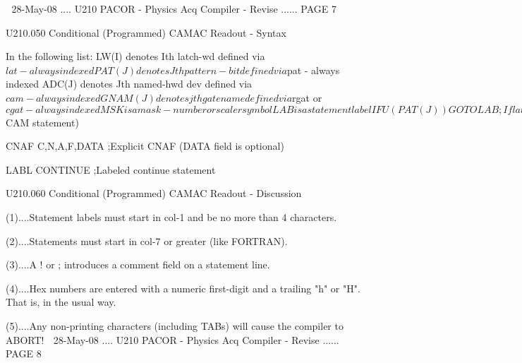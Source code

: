     
   28-May-08 .... U210  PACOR -  Physics Acq Compiler - Revise ...... PAGE   7
 
 
 
   U210.050  Conditional (Programmed) CAMAC Readout - Syntax
 
   In the following list:
   LW(I)   denotes Ith latch-wd      defined via $lat      - always indexed
   PAT(J)  denotes Jth pattern-bit   defined via $pat      - always indexed
   ADC(J)  denotes Jth named-hwd dev defined via $cam      - always indexed
   GNAM(J) denotes jth gatename defined via $rgat or $cgat - always indexed
   MSK is a mask - number or scaler symbol
   LAB is a statement label
 
   IFU(PAT(J))GOTO LAB    ;If latch-bit implied by PAT(J) not set,  GOTO LAB
   IFS(PAT(J))GOTO LAB    ;If latch-bit implied by PAT(J)  is set,  GOTO LAB
 
   IFT(GNAM(J))GOTO LAB   ;If raw or calculated gate GNAM(J) true,  GOTO LAB
   IFF(GNAM(J))GOTO LAB   ;If raw or calculated gate GNAM(J) false, GOTO LAB
 
   IFA(LW(I),MSK)GOTO LAB ;If any bits set in MSK are set in LW(I), GOTO LAB
   IFN(LW(I),MSK)GOTO LAB ;If no  bits set in MSK are set in LW(I), GOTO LAB
 
   GOTO LAB               ;Unconditional GOTO LAB
 
   READ ADC(J)            ;Read ADC(J) (C,N,A,F defined in $CAM statement)
 
   CNAF C,N,A,F,DATA      ;Explicit CNAF (DATA field is optional)
 
   LABL  CONTINUE         ;Labeled continue statement
 
 
 
   U210.060  Conditional (Programmed) CAMAC Readout - Discussion
 
 
   (1)....Statement labels  must  start  in  col-1  and  be  no  more  than  4
          characters.
 
   (2)....Statements must start in col-7 or greater (like FORTRAN).
 
   (3)....A ! or ; introduces a comment field on a statement line.
 
   (4)....Hex  numbers  are  entered with a numeric first-digit and a trailing
          "h" or "H". That is, in the usual way.
 
   (5)....Any   non-printing   characters  (including  TABs)  will  cause  the
          compiler to ABORT!
    
   28-May-08 .... U210  PACOR -  Physics Acq Compiler - Revise ...... PAGE   8
 
